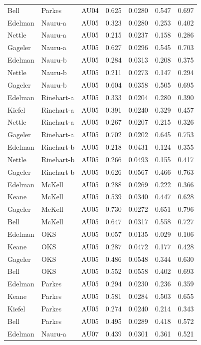 \documentclass{monashthesis}
\begin{document}
\begin{center}
\begin{longtable}{lllllll}
Bell & Parkes & AU04 & 0.625 & 0.0280 & 0.547 & 0.697 \\
Edelman & Nauru-a & AU05 & 0.323 & 0.0280 & 0.253 & 0.402 \\
Nettle & Nauru-a & AU05 & 0.215 & 0.0237 & 0.158 & 0.286 \\
Gageler & Nauru-a & AU05 & 0.627 & 0.0296 & 0.545 & 0.703 \\
Edelman & Nauru-b & AU05 & 0.284 & 0.0313 & 0.208 & 0.375 \\
Nettle & Nauru-b & AU05 & 0.211 & 0.0273 & 0.147 & 0.294 \\
Gageler & Nauru-b & AU05 & 0.604 & 0.0358 & 0.505 & 0.695 \\
Edelman & Rinehart-a & AU05 & 0.333 & 0.0204 & 0.280 & 0.390 \\
Kiefel & Rinehart-a & AU05 & 0.391 & 0.0240 & 0.329 & 0.457 \\
Nettle & Rinehart-a & AU05 & 0.267 & 0.0207 & 0.215 & 0.326 \\
Gageler & Rinehart-a & AU05 & 0.702 & 0.0202 & 0.645 & 0.753 \\
Edelman & Rinehart-b & AU05 & 0.218 & 0.0431 & 0.124 & 0.355 \\
Nettle & Rinehart-b & AU05 & 0.266 & 0.0493 & 0.155 & 0.417 \\
Gageler & Rinehart-b & AU05 & 0.626 & 0.0567 & 0.466 & 0.763 \\
Edelman & McKell & AU05 & 0.288 & 0.0269 & 0.222 & 0.366 \\
Keane & McKell & AU05 & 0.539 & 0.0340 & 0.447 & 0.628 \\
Gageler & McKell & AU05 & 0.730 & 0.0272 & 0.651 & 0.796 \\
Bell & McKell & AU05 & 0.647 & 0.0317 & 0.558 & 0.727 \\
Edelman & OKS & AU05 & 0.057 & 0.0135 & 0.029 & 0.106 \\
Keane & OKS & AU05 & 0.287 & 0.0472 & 0.177 & 0.428 \\
Gageler & OKS & AU05 & 0.486 & 0.0548 & 0.344 & 0.630 \\
Bell & OKS & AU05 & 0.552 & 0.0558 & 0.402 & 0.693 \\
Edelman & Parkes & AU05 & 0.294 & 0.0230 & 0.236 & 0.359 \\
Keane & Parkes & AU05 & 0.581 & 0.0284 & 0.503 & 0.655 \\
Kiefel & Parkes & AU05 & 0.274 & 0.0240 & 0.214 & 0.343 \\
Bell & Parkes & AU05 & 0.495 & 0.0289 & 0.418 & 0.572 \\
Edelman & Nauru-a & AU07 & 0.439 & 0.0301 & 0.361 & 0.521 \\

\end{longtable}
\end{center}
\end{document}
